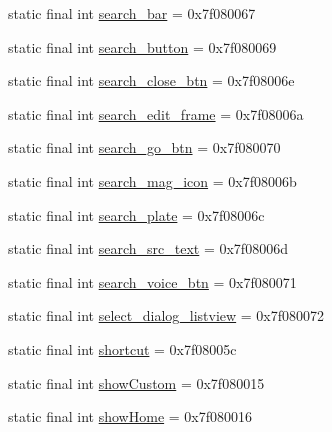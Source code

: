 \begin{CompactItemize}
\item 
static final int \hyperlink{classandroid_1_1support_1_1graphics_1_1drawable_1_1_r_1_1id_684554823950e4a9d84aaf7bb0e0aac3}{search\_\-bar} = 0x7f080067
\item 
static final int \hyperlink{classandroid_1_1support_1_1graphics_1_1drawable_1_1_r_1_1id_366a82b030e74bf7013b809ee3193c44}{search\_\-button} = 0x7f080069
\item 
static final int \hyperlink{classandroid_1_1support_1_1graphics_1_1drawable_1_1_r_1_1id_863b9794f0645c5472c990a657d7a910}{search\_\-close\_\-btn} = 0x7f08006e
\item 
static final int \hyperlink{classandroid_1_1support_1_1graphics_1_1drawable_1_1_r_1_1id_cc3e8e350ae79d8dda3ff6e241c64c35}{search\_\-edit\_\-frame} = 0x7f08006a
\item 
static final int \hyperlink{classandroid_1_1support_1_1graphics_1_1drawable_1_1_r_1_1id_eeb38b34e36d6c0ae4be1f2284bde66d}{search\_\-go\_\-btn} = 0x7f080070
\item 
static final int \hyperlink{classandroid_1_1support_1_1graphics_1_1drawable_1_1_r_1_1id_d0ba6b70d8ddeb3a1ea3d3905f6a58c6}{search\_\-mag\_\-icon} = 0x7f08006b
\item 
static final int \hyperlink{classandroid_1_1support_1_1graphics_1_1drawable_1_1_r_1_1id_a60693bbea38b03375c2e948ed3e1dda}{search\_\-plate} = 0x7f08006c
\item 
static final int \hyperlink{classandroid_1_1support_1_1graphics_1_1drawable_1_1_r_1_1id_7b9bba2075435c1819cb164bf998298f}{search\_\-src\_\-text} = 0x7f08006d
\item 
static final int \hyperlink{classandroid_1_1support_1_1graphics_1_1drawable_1_1_r_1_1id_e3c86dd7f64b67c81242df8af4977620}{search\_\-voice\_\-btn} = 0x7f080071
\item 
static final int \hyperlink{classandroid_1_1support_1_1graphics_1_1drawable_1_1_r_1_1id_effa3aa2931f1b2e8df6c67f3b1d3ca4}{select\_\-dialog\_\-listview} = 0x7f080072
\item 
static final int \hyperlink{classandroid_1_1support_1_1graphics_1_1drawable_1_1_r_1_1id_50c8c73cb6ef6fe0244b3cf86a51fa5e}{shortcut} = 0x7f08005c
\item 
static final int \hyperlink{classandroid_1_1support_1_1graphics_1_1drawable_1_1_r_1_1id_d7d6cde1f6aa40b0253f729b6cd5b905}{showCustom} = 0x7f080015
\item 
static final int \hyperlink{classandroid_1_1support_1_1graphics_1_1drawable_1_1_r_1_1id_4b2cb47cf4e0686858c56065e23026e9}{showHome} = 0x7f080016

\end{CompactItemize}
